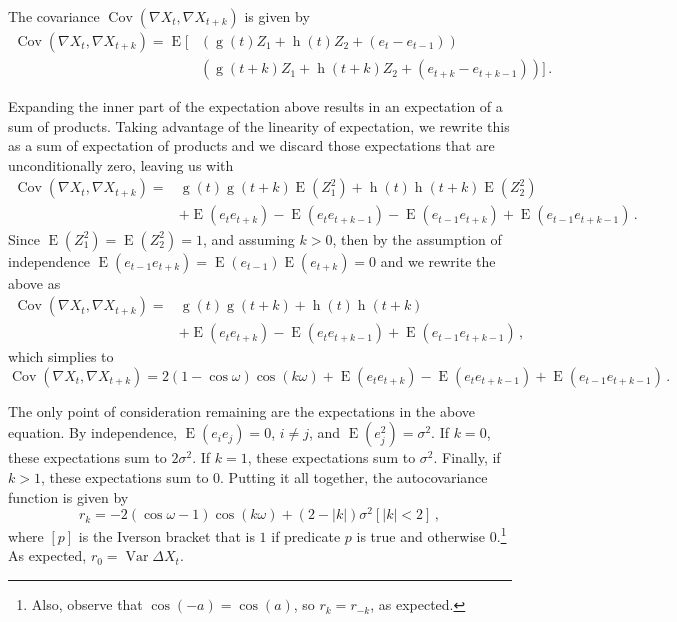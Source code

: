 \documentclass[10pt]{fphw}
\theoremstyle{definition}
\newcommand{\var}{\operatorname{Var}}
\newcommand{\expect}{\operatorname{E}}
\newcommand{\cov}{\operatorname{Cov}}
\begin{document}
\begin{enumerate}
The covariance $\cov(\nabla X_t,\nabla X_{t+k})$ is given by
\begin{equation}
\begin{split}
    \cov(\nabla X_t,\nabla X_{t+k}) = \expect
        [
            &(\operatorname{g}(t) Z_1 +
                \operatorname{h}(t) Z_2 + (e_t - e_{t-1}))\\
            &(\operatorname{g}(t+k) Z_1 +
                \operatorname{h}(t+k) Z_2 + (e_{t+k} - e_{t+k-1}))
        ]\,.
\end{split}
\end{equation}

Expanding the inner part of the expectation above results in an expectation of a sum of products.
Taking advantage of the linearity of expectation, we rewrite this as a sum of expectation of products and we
discard those expectations that are unconditionally zero, leaving us with
\begin{equation}
\begin{split}
\cov(\nabla X_t,\nabla X_{t+k}) =
    &\operatorname{g}(t)\operatorname{g}(t+k)\expect(Z^2_1) + \operatorname{h}(t)\operatorname{h}(t+k)\expect(Z^2_2)\\
    &+ \expect(e_t e_{t+k}) - \expect(e_t e_{t+k-1}) - \expect(e_{t-1} e_{t+k}) + \expect(e_{t-1} e_{t+k-1})\,.
\end{split}
\end{equation}
Since $\expect(Z_1^2) = \expect(Z_2^2) = 1$, and assuming $k > 0$, then by the assumption of independence $\expect(e_{t-1} e_{t+k}) = \expect(e_{t-1}) \expect(e_{t+k}) = 0$ and we rewrite the above as
\begin{equation}
\begin{split}
\cov(\nabla X_t,\nabla X_{t+k}) =
    &\operatorname{g}(t)\operatorname{g}(t+k) + \operatorname{h}(t)\operatorname{h}(t+k)\\
    &+ \expect(e_t e_{t+k}) - \expect(e_t e_{t+k-1}) + \expect(e_{t-1} e_{t+k-1})\,,
\end{split}
\end{equation}
which simplies to
\begin{equation}
    \cov(\nabla X_t,\nabla X_{t+k}) = 2(1-\cos\omega) \cos(k \omega) + \expect(e_t e_{t+k}) - \expect(e_t e_{t+k-1}) + \expect(e_{t-1} e_{t+k-1})\,.
\end{equation}

The only point of consideration remaining are the expectations in the above equation.
By independence, $\expect(e_i e_j) = 0$, $i \neq j$, and $\expect(e^2_j) = \sigma^2$.
If $k = 0$, these expectations sum to $2 \sigma^2$.
If $k = 1$, these expectations sum to $\sigma^2$.
Finally, if $k > 1$, these expectations sum to $0$.
Putting it all together, the autocovariance function is given by
\begin{equation}
r_k = -2(\cos\omega-1) \cos(k \omega) + (2-|k|)\sigma^2[|k| < 2]\,,
\end{equation}
where $[p]$ is the Iverson bracket that is $1$ if predicate $p$ is true and otherwise $0$.\footnote{Also, observe that $\cos(-a) = \cos(a)$, so $r_k = r_{-k}$, as expected.}
As expected, $r_0 = \var \Delta X_t$.


\end{enumerate}
\end{document}
